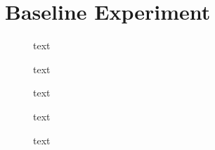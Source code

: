 \section{Baseline Experiment}

\begin{figure}[h]
	\centering
	
	\caption{text}
\end{figure}

\begin{figure}[h]
	\centering
	
	
	\caption{text}
	
	\vspace*{2cm}
	
	
	\caption{text}
\end{figure}

\begin{figure}[h]
	\centering

	
	\caption{text}
	
	\vspace*{2cm}
	
	
	\caption{text}
\end{figure}